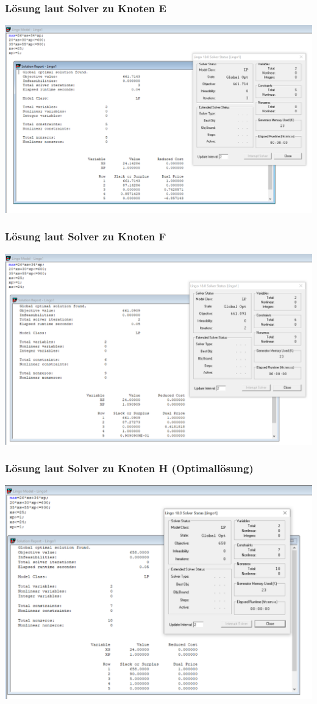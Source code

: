 \documentclass[a4paper,11pt]{article}
\begin{document}
\subsubsection*{Lösung laut Solver zu Knoten E}
\begin{centering}
	\includegraphics[width=0.65\linewidth]{src/blatt_5_aufgabe_2_teilaufgabe_b_knoten_e_loesung_solver.png}
\end{centering}

\subsubsection*{Lösung laut Solver zu Knoten F}
\begin{centering}
	\includegraphics[width=0.65\linewidth]{src/blatt_5_aufgabe_2_teilaufgabe_b_knoten_f_loesung_solver.png}
\end{centering}

\subsubsection*{Lösung laut Solver zu Knoten H (Optimallösung)}
\begin{centering}
	\includegraphics[width=0.65\linewidth]{src/blatt_5_aufgabe_2_teilaufgabe_b_knoten_h_loesung_solver.png}
\end{centering}
\end{document}
